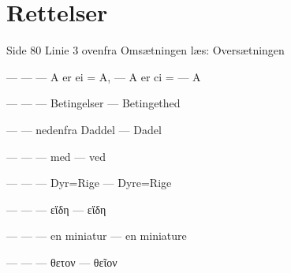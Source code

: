 \documentclass[12pt]{book}
\begin{document}
\chapter*{Rettelser}
{\small\setlength{\parindent}{0pt}
Side 80 Linie 3 ovenfra Omsætningen læs: Oversætningen\par
---  \quad ---  \quad --- \quad A er ei = A, \quad --- \quad A er ci = --- A\par
---  \quad ---  \quad --- \quad Betingelser \quad --- \quad Betingethed\par
---  \quad ---  nedenfra \quad Daddel \quad --- \quad Dadel\par
---  \quad ---  \quad --- \quad med \quad --- \quad ved\par
---  \quad ---  \quad --- \quad Dyr=Rige \quad --- \quad Dyre=Rige\par
---  \quad ---  \quad --- \quad εἵδη \quad --- \quad εἴδη\par
---  \quad ---  \quad --- \quad en miniatur \quad --- \quad en miniature\par
---  \quad ---  \quad --- \quad θετον \quad --- \quad θεῖον\par
}
\end{document}
